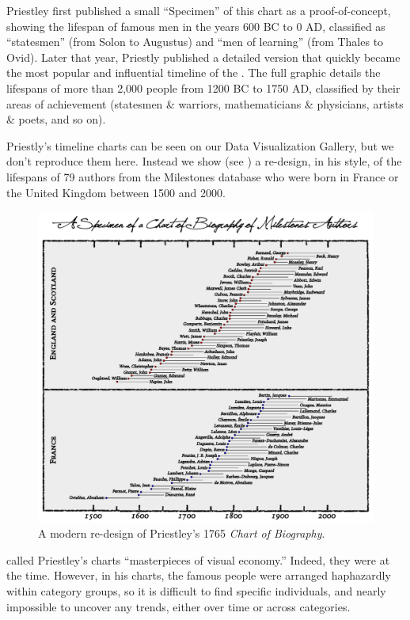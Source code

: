Priestley first published a small ``Specimen'' of this chart as a proof-of-concept, showing the lifespan of famous men in 
the years 600 BC to 0 AD, classified as ``statesmen'' (from Solon to Augustus) and ``men of learning'' (from Thales to Ovid). 
Later that year, Priestly published a detailed version \citeyear{Priestley:1765} that quickly became the most popular and influential timeline of the .  The full graphic details the lifespans of more than 2,000 people from 1200 BC to 1750 AD, classified by their areas of achievement (statesmen \& warriors, mathematicians \& physicians, artists \& poets, and so on).

Priestly's timeline charts can be seen on our Data Visualization Gallery, but we don't reproduce them here.  
Instead we show (see ) a re-design, in his style, of the lifespans of 79 authors from the Milestones database who were born in France or the United Kingdom between 1500 and 2000. 

\begin{figure}[!htb]
  \centering
  \includegraphics[width=.95\textwidth,clip]{fig/timespan}
  \caption{A modern re-design of Priestley's 1765 \emph{Chart of Biography}.}
  \label{fig:timespan}
\end{figure}

\citet[p. 117]{RosenbergGrafton:2010} called Priestley's charts ``masterpieces of visual economy.'' Indeed, they were at the time.  However, in his charts, the famous people were arranged haphazardly within category groups, so it is difficult to find specific individuals, and nearly impossible to uncover any trends, either over time or across categories. 

